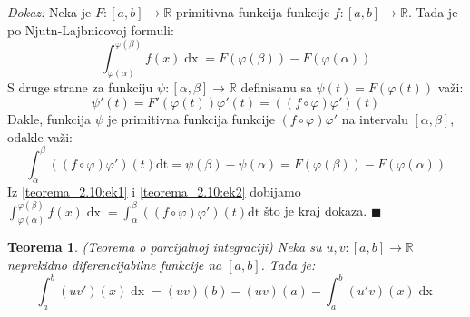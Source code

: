 \documentclass{article}
\newtheorem{teorema}{Teorema}[section]
\DeclareMathOperator{\dx}{dx}
\begin{document}
\textit{Dokaz:} Neka je $F:\left[a,b\right]\longrightarrow \mathbb{R}$ primitivna funkcija funkcije $f:\left[a,b\right]\longrightarrow\mathbb{R}$. Tada je po Njutn-Lajbnicovoj formuli:
\begin{equation}
    \label{teorema_2.10:ek1}
    \displaystyle\int^{\varphi\left(\beta\right)}_{\varphi\left(\alpha\right)}f\left(x\right)\dx = F\left(\varphi\left(\beta\right)\right)-F\left(\varphi\left(\alpha\right)\right)
\end{equation}
S druge strane za funkciju $\psi:\left[\alpha,\beta\right]\longrightarrow\mathbb{R}$ definisanu sa $\psi\left(t\right) = F\left(\varphi\left(t\right)\right)$ važi:
\begin{equation*}
    \psi'\left(t\right) = F'\left(\varphi\left(t\right)\right)\varphi'\left(t\right) = \left(\left(f\circ\varphi\right)\varphi'\right)\left(t\right)
\end{equation*}
Dakle, funkcija $\psi$ je primitivna funkcija funkcije $\left(f\circ\varphi\right)\varphi'$ na intervalu $\left[\alpha,\beta\right]$, odakle važi:
\begin{equation}
    \displaystyle\int^\beta_\alpha \left(\left(f\circ\varphi\right)\varphi'\right)\left(t\right)\text{dt} = \psi\left(\beta\right) - \psi\left(\alpha\right) = F\left(\varphi\left(\beta\right)\right) - F\left(\varphi\left(\alpha\right)\right)
    \label{teorema_2.10:ek2}
\end{equation}
Iz \eqref{teorema_2.10:ek1} i \eqref{teorema_2.10:ek2} dobijamo $\displaystyle\int^{\varphi\left(\beta\right)}_{\varphi\left(\alpha\right)} f\left(x\right)\dx = \int^\beta_\alpha \left(\left(f\circ\varphi\right)\varphi'\right)\left(t\right)\text{dt}$ što je kraj dokaza.
\null\hfill $\blacksquare$\par

\begin{teoremabox}
    \label{teorema_2.11}
    \begin{teorema}
        (Teorema o parcijalnoj integraciji) Neka su $u, v: \left[a, b\right] \longrightarrow\mathbb{R}$ neprekidno diferencijabilne funkcije na $\left[a,b\right]$. Tada je:
        $$\displaystyle\int^b_a\left(uv'\right)\left(x\right)\dx = \left(uv\right)\left(b\right) - \left(uv\right)\left(a\right) - \int^b_a\left(u'v\right)\left(x\right)\dx$$
    \end{teorema}
\end{teoremabox}
\end{document}
